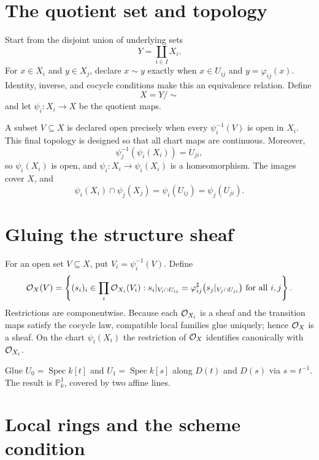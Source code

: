 

\section{The quotient set and topology}

Start from the disjoint union of underlying sets
\[
Y=\coprod_{i\in I}X_i.
\]
For $x\in X_i$ and $y\in X_j$, declare $x\sim y$ exactly when $x\in U_{ij}$ and
$y=\varphi_{ij}(x)$.  Identity, inverse, and cocycle conditions make this an equivalence relation.
Define
\[
X=Y/{\sim}
\]
and let $\psi_i:X_i\to X$ be the quotient maps.

A subset $V\subseteq X$ is declared open precisely when every $\psi_i^{-1}(V)$ is open in $X_i$.
This final topology is designed so that all chart maps are continuous.  Moreover,
\[
\psi_j^{-1}(\psi_i(X_i))=U_{ji},
\]
so $\psi_i(X_i)$ is open, and $\psi_i:X_i\to\psi_i(X_i)$ is a homeomorphism.
The images cover $X$, and
\[
\psi_i(X_i)\cap\psi_j(X_j)=\psi_i(U_{ij})=\psi_j(U_{ji}).
\]



\section{Gluing the structure sheaf}

For an open set $V\subseteq X$, put $V_i=\psi_i^{-1}(V)$.  Define
\[
\mathcal O_X(V)=
\left\{(s_i)_i\in\prod_i\mathcal O_{X_i}(V_i):
 s_i|_{V_i\cap U_{ij}}
 =\varphi_{ij}^{\sharp}\bigl(s_j|_{V_j\cap U_{ji}}\bigr)
 \text{ for all }i,j
\right\}.
\]
Restrictions are componentwise.  Because each $\mathcal O_{X_i}$ is a sheaf and the transition maps
satisfy the cocycle law, compatible local families glue uniquely; hence $\mathcal O_X$ is a sheaf.
On the chart $\psi_i(X_i)$ the restriction of $\mathcal O_X$ identifies canonically with $\mathcal O_{X_i}$.



\begin{example}\label{ex:vi20-expand-01}
Glue $U_0=\operatorname{Spec}k[t]$ and $U_1=\operatorname{Spec}k[s]$ along $D(t)$ and $D(s)$ via $s=t^{-1}$.  The result is $\mathbb P^1_k$, covered by two affine lines.
\end{example}
\section{Local rings and the scheme condition}

